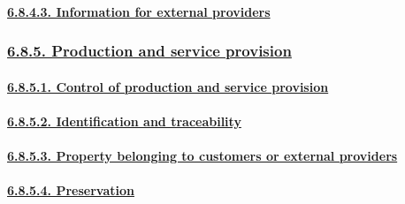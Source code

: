 \documentclass[
]{article}
\begin{document}
\hypertarget{information-for-external-providers}{%
\paragraph{\texorpdfstring{\protect\hyperlink{information-for-external-providers-1}{6.8.4.3.
Information for external
providers}}{6.8.4.3. Information for external providers}}\label{information-for-external-providers}}

\hypertarget{production-and-service-provision}{%
\subsubsection{\texorpdfstring{\protect\hyperlink{production-and-service-provision-1}{6.8.5.
Production and service
provision}}{6.8.5. Production and service provision}}\label{production-and-service-provision}}

\hypertarget{control-of-production-and-service-provision}{%
\paragraph{\texorpdfstring{\protect\hyperlink{control-of-production-and-service-provision-1}{6.8.5.1.
Control of production and service
provision}}{6.8.5.1. Control of production and service provision}}\label{control-of-production-and-service-provision}}

\hypertarget{identification-and-traceability}{%
\paragraph{\texorpdfstring{\protect\hyperlink{identification-and-traceability-1}{6.8.5.2.
Identification and
traceability}}{6.8.5.2. Identification and traceability}}\label{identification-and-traceability}}

\hypertarget{property-belonging-to-customers-or-external-providers}{%
\paragraph{\texorpdfstring{\protect\hyperlink{property-belonging-to-customers-or-external-providers-1}{6.8.5.3.
Property belonging to customers or external
providers}}{6.8.5.3. Property belonging to customers or external providers}}\label{property-belonging-to-customers-or-external-providers}}

\hypertarget{preservation}{%
\paragraph{\texorpdfstring{\protect\hyperlink{preservation-1}{6.8.5.4.
Preservation}}{6.8.5.4. Preservation}}\label{preservation}}
\end{document}
